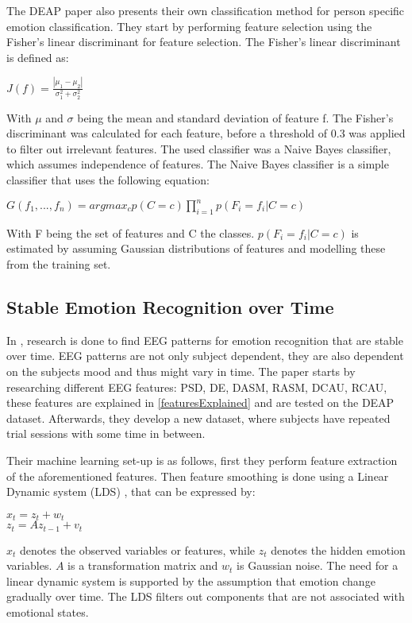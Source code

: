 \npar

The DEAP paper also presents their own classification method for person specific emotion classification. They start by performing feature selection using the Fisher's linear discriminant for feature selection. The Fisher's linear discriminant is defined as:

\begin{center}
$J(f) = \frac{|\mu_1 - \mu_2|}{\sigma_1^2 + \sigma_2^2}$ \
\end{center}

With $\mu$ and $\sigma$ being the mean and standard deviation of feature f. The Fisher's discriminant was calculated for each feature, before a threshold of 0.3 was applied to filter out irrelevant features. The used classifier was a Naive Bayes classifier, which assumes independence of features. The Naive Bayes classifier is a simple classifier that uses the following equation:

\begin{center}
$G(f_1, ..., f_n) = argmax_c p(C=c) \prod\limits_{i=1}^n p(F_i=f_i|C=c)$ \\
\end{center}

With F being the set of features and C the classes. $p(F_i=f_i|C=c)$ is estimated by assuming Gaussian distributions of features and modelling these from the training set.

\subsection{Stable Emotion Recognition over Time}

In \citep{killyPaper}, research is done to find EEG patterns for emotion recognition that are stable over time. EEG patterns are not only subject dependent, they are also dependent on the subjects mood and thus might vary in time. The paper starts by researching different EEG features: PSD, DE, DASM, RASM, DCAU, RCAU, these features are explained in \ref{featuresExplained} and are tested on the DEAP dataset. Afterwards, they develop a new dataset, where subjects have repeated trial sessions with some time in between.

\npar

Their machine learning set-up is as follows, first they perform feature extraction of the aforementioned features. Then feature smoothing is done using a Linear Dynamic system (LDS) , that can be expressed by:
\begin{center}
$x_t = z_t + w_t$\\
$z_t = Az_{t-1} + v_t$
\end{center}
$x_t$ denotes the observed variables or features, while $z_t$ denotes the hidden emotion variables. $A$ is a transformation matrix and $w_t$ is Gaussian noise. The need for a linear dynamic system is supported by the assumption that emotion change gradually over time. The LDS filters out components that are not associated with emotional states.

